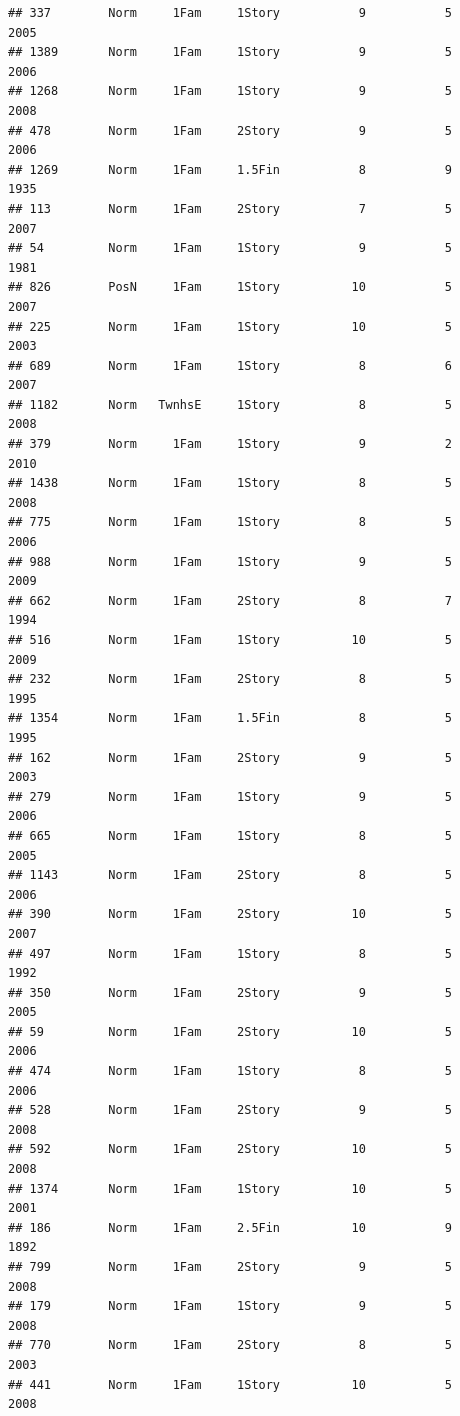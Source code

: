 \documentclass[]{article}
\begin{document}
\begin{verbatim}
## 337        Norm     1Fam     1Story           9           5      2005
## 1389       Norm     1Fam     1Story           9           5      2006
## 1268       Norm     1Fam     1Story           9           5      2008
## 478        Norm     1Fam     2Story           9           5      2006
## 1269       Norm     1Fam     1.5Fin           8           9      1935
## 113        Norm     1Fam     2Story           7           5      2007
## 54         Norm     1Fam     1Story           9           5      1981
## 826        PosN     1Fam     1Story          10           5      2007
## 225        Norm     1Fam     1Story          10           5      2003
## 689        Norm     1Fam     1Story           8           6      2007
## 1182       Norm   TwnhsE     1Story           8           5      2008
## 379        Norm     1Fam     1Story           9           2      2010
## 1438       Norm     1Fam     1Story           8           5      2008
## 775        Norm     1Fam     1Story           8           5      2006
## 988        Norm     1Fam     1Story           9           5      2009
## 662        Norm     1Fam     2Story           8           7      1994
## 516        Norm     1Fam     1Story          10           5      2009
## 232        Norm     1Fam     2Story           8           5      1995
## 1354       Norm     1Fam     1.5Fin           8           5      1995
## 162        Norm     1Fam     2Story           9           5      2003
## 279        Norm     1Fam     1Story           9           5      2006
## 665        Norm     1Fam     1Story           8           5      2005
## 1143       Norm     1Fam     2Story           8           5      2006
## 390        Norm     1Fam     2Story          10           5      2007
## 497        Norm     1Fam     1Story           8           5      1992
## 350        Norm     1Fam     2Story           9           5      2005
## 59         Norm     1Fam     2Story          10           5      2006
## 474        Norm     1Fam     1Story           8           5      2006
## 528        Norm     1Fam     2Story           9           5      2008
## 592        Norm     1Fam     2Story          10           5      2008
## 1374       Norm     1Fam     1Story          10           5      2001
## 186        Norm     1Fam     2.5Fin          10           9      1892
## 799        Norm     1Fam     2Story           9           5      2008
## 179        Norm     1Fam     1Story           9           5      2008
## 770        Norm     1Fam     2Story           8           5      2003
## 441        Norm     1Fam     1Story          10           5      2008

\end{verbatim}
\end{document}

